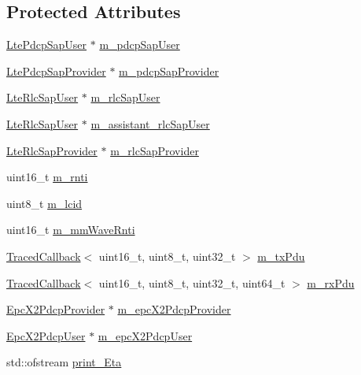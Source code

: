 \subsection*{Protected Attributes}
\begin{DoxyCompactItemize}
\item 
\hyperlink{classns3_1_1LtePdcpSapUser}{Lte\+Pdcp\+Sap\+User} $\ast$ \hyperlink{classns3_1_1McEnbPdcp_a9605a9b8b5e47d5467837e1d6c88a17a}{m\+\_\+pdcp\+Sap\+User}
\item 
\hyperlink{classns3_1_1LtePdcpSapProvider}{Lte\+Pdcp\+Sap\+Provider} $\ast$ \hyperlink{classns3_1_1McEnbPdcp_a597f57772c73e425f2cc166046335825}{m\+\_\+pdcp\+Sap\+Provider}
\item 
\hyperlink{classns3_1_1LteRlcSapUser}{Lte\+Rlc\+Sap\+User} $\ast$ \hyperlink{classns3_1_1McEnbPdcp_a2fd42407cd6850112abf271e6f412963}{m\+\_\+rlc\+Sap\+User}
\item 
\hyperlink{classns3_1_1LteRlcSapUser}{Lte\+Rlc\+Sap\+User} $\ast$ \hyperlink{classns3_1_1McEnbPdcp_aa812311fd3cb54342eb7dea79cff8d4f}{m\+\_\+assistant\+\_\+rlc\+Sap\+User}
\item 
\hyperlink{classns3_1_1LteRlcSapProvider}{Lte\+Rlc\+Sap\+Provider} $\ast$ \hyperlink{classns3_1_1McEnbPdcp_a7539c4070d51863d1434d9cfeed84310}{m\+\_\+rlc\+Sap\+Provider}
\item 
uint16\+\_\+t \hyperlink{classns3_1_1McEnbPdcp_aff9ff9c543196c0745b2f9bc4347b968}{m\+\_\+rnti}
\item 
uint8\+\_\+t \hyperlink{classns3_1_1McEnbPdcp_a7bed538d407d2fad4bd939d95da02685}{m\+\_\+lcid}
\item 
uint16\+\_\+t \hyperlink{classns3_1_1McEnbPdcp_a2a77a25583c8400e8c97314fc21841c5}{m\+\_\+mm\+Wave\+Rnti}
\item 
\hyperlink{classns3_1_1TracedCallback}{Traced\+Callback}$<$ uint16\+\_\+t, uint8\+\_\+t, uint32\+\_\+t $>$ \hyperlink{classns3_1_1McEnbPdcp_a48d23e15667a3d5cc447019b595196ba}{m\+\_\+tx\+Pdu}
\item 
\hyperlink{classns3_1_1TracedCallback}{Traced\+Callback}$<$ uint16\+\_\+t, uint8\+\_\+t, uint32\+\_\+t, uint64\+\_\+t $>$ \hyperlink{classns3_1_1McEnbPdcp_af263990d8ad04a88ad3d6a4fba42c976}{m\+\_\+rx\+Pdu}
\item 
\hyperlink{classns3_1_1EpcX2PdcpProvider}{Epc\+X2\+Pdcp\+Provider} $\ast$ \hyperlink{classns3_1_1McEnbPdcp_aff328b08ea32259fd2859927a89d280f}{m\+\_\+epc\+X2\+Pdcp\+Provider}
\item 
\hyperlink{classns3_1_1EpcX2PdcpUser}{Epc\+X2\+Pdcp\+User} $\ast$ \hyperlink{classns3_1_1McEnbPdcp_a125a92e7cc2a302cb86e340636acc587}{m\+\_\+epc\+X2\+Pdcp\+User}
\item 
std\+::ofstream \hyperlink{classns3_1_1McEnbPdcp_a57c99adb46af0b69eac73f4d87c9b2f4}{print\+\_\+\+Eta}
\end{DoxyCompactItemize}
